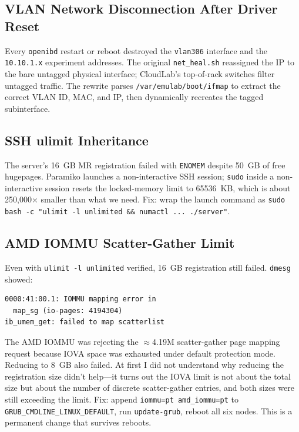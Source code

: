 \documentclass[10pt,twocolumn]{article}
\begin{document}
\subsection{VLAN Network Disconnection After Driver Reset}

Every \texttt{openibd} restart or reboot destroyed the \texttt{vlan306}
interface and the \texttt{10.10.1.x} experiment addresses.
The original \texttt{net\_heal.sh} reassigned the IP to the bare untagged
physical interface; CloudLab's top-of-rack switches filter untagged traffic.
The rewrite parses \texttt{/var/emulab/boot/ifmap} to extract the correct VLAN
ID, MAC, and IP, then dynamically recreates the tagged subinterface.

\subsection{SSH ulimit Inheritance}

The server's 16~GB MR registration failed with \texttt{ENOMEM} despite 50~GB
of free hugepages.
Paramiko launches a non-interactive SSH session; \texttt{sudo} inside a
non-interactive session resets the locked-memory limit to 65536~KB, which is
about 250,000$\times$ smaller than what we need.
Fix: wrap the launch command as
\texttt{sudo bash -c "ulimit -l unlimited \&\& numactl ... ./server"}.

\subsection{AMD IOMMU Scatter-Gather Limit}

Even with \texttt{ulimit -l unlimited} verified, 16~GB registration still
failed. \texttt{dmesg} showed:

\begin{lstlisting}
0000:41:00.1: IOMMU mapping error in
  map_sg (io-pages: 4194304)
ib_umem_get: failed to map scatterlist
\end{lstlisting}

The AMD IOMMU was rejecting the $\approx$4.19M scatter-gather page mapping
request because IOVA space was exhausted under default protection mode.
Reducing to 8~GB also failed.
At first I did not understand why reducing the registration size didn't help---it
turns out the IOVA limit is not about the total size but about the number of
discrete scatter-gather entries, and both sizes were still exceeding the limit.
Fix: append \texttt{iommu=pt amd\_iommu=pt} to
\texttt{GRUB\_CMDLINE\_LINUX\_DEFAULT}, run \texttt{update-grub}, reboot all
six nodes.
This is a permanent change that survives reboots.
\end{document}
